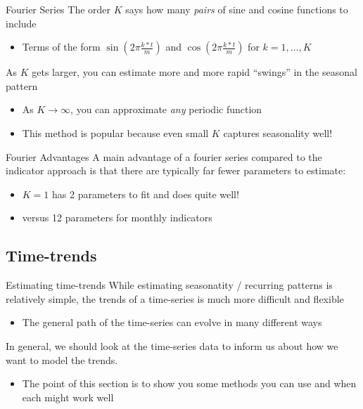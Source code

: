\documentclass[aspectratio=169,t,11pt,table]{beamer}
\begin{document}
\begin{frame}{Fourier Series}
  The \alert{order} $K$ says how many \emph{pairs} of sine and cosine functions to include
  \begin{itemize}
    \item Terms of the form $\sin\left(2\pi \frac{k * t}{m}\right)$ and $\cos \left(2\pi \frac{k * t}{m}\right)$ for $k = 1, \dots, K$
  \end{itemize}

  \bigskip
  As $K$ gets larger, you can estimate more and more rapid ``swings'' in the seasonal pattern
  \begin{itemize}
    \item As $K \to \infty$, you can approximate \emph{any} periodic function
    
    \item This method is popular because even small $K$ captures seasonality well!
  \end{itemize}
\end{frame}


\begin{frame}{Fourier Advantages}
  A main advantage of a fourier series compared to the indicator approach is that there are typically far fewer parameters to estimate:
  \begin{itemize}
    \item $K = 1$ has 2 parameters to fit and does quite well!
    
    \item versus 12 parameters for monthly indicators
  \end{itemize}
\end{frame}


\subsection{Time-trends}

\begin{frame}{Estimating time-trends}
  While estimating seasonatity / recurring patterns is relatively simple, the trends of a time-series is much more difficult and flexible
  \begin{itemize}
    \item The general path of the time-series can evolve in many different ways
  \end{itemize}

  \bigskip
  In general, we should look at the time-series data to inform us about how we want to model the trends. 
  \begin{itemize}
    \item The point of this section is to show you some methods you can use and when each might work well
  \end{itemize}
\end{frame}
\end{document}
